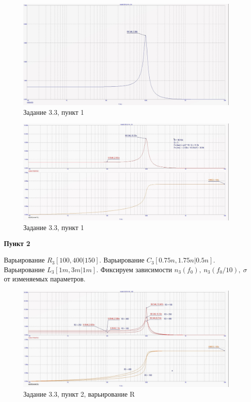 \documentclass[a4paper, 14pt]{extarticle}%
\begin{document}
\begin{figure}[h!]
			\centering
			\includegraphics[width=1.1\linewidth]{3/3_3_1.jpg}
			\caption{Задание 3.3, пункт 1}
			\label{A}
\end{figure}



\begin{figure}[h!]
			\centering
			\includegraphics[width=1.1\linewidth]{3/3_3_2.jpg}
			\caption{Задание 3.3, пункт 1}
			\label{A}
\end{figure}



\textbf{Пункт 2}

Варьирование $R_3[100, 400 | 150]$.
\newline
Варьирование $C_3[0.75n, 1.75n | 0.5n]$.
\newline
Варьирование $L_3[1m, 3m | 1m]$.
\newline
Фиксируем зависимости $n_3(f_0), \: n_3(f_0/10), \: \sigma$ от изменяемых параметров.


\begin{figure}[h!]
			\centering
			\includegraphics[width=1.1\linewidth]{3/3_3_5.jpg}
			\caption{Задание 3.3, пункт 2, варьирование R}
			\label{A}
\end{figure}
\end{document}
